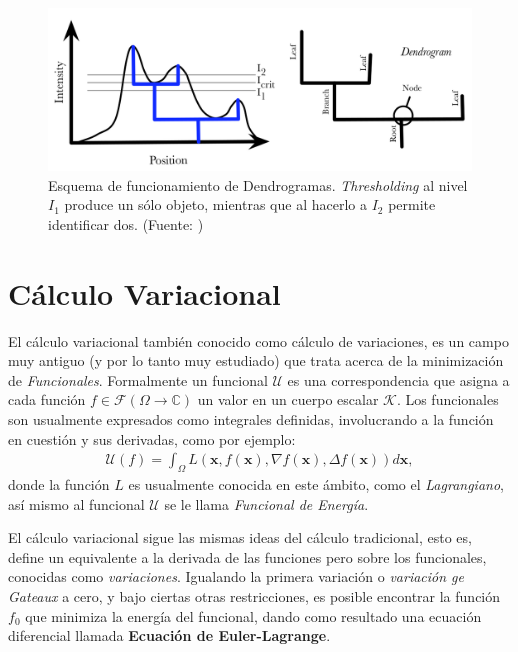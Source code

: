 \begin{figure}[htpb!]
\centering
\includegraphics[width=12cm]{dendro}
\caption{Esquema de funcionamiento de Dendrogramas. \textit{Thresholding} al nivel $I_1$ produce un sólo objeto, mientras que al hacerlo a $I_2$ permite identificar dos. (Fuente: \cite{Rosolowsky})}
\label{fig:dendro}
\end{figure}





\section{Cálculo Variacional}
El cálculo variacional también conocido como cálculo de variaciones, es un campo muy antiguo (y por lo tanto muy estudiado) que trata acerca de la minimización de \textit{Funcionales}. Formalmente un funcional $\mathcal{U}$ es una correspondencia que asigna a cada función $f \in \mathcal{F}(\Omega \rightarrow \mathbb{C})$ un valor en un cuerpo escalar $\mathcal{K}$. Los funcionales son usualmente expresados como integrales definidas, involucrando a la función en cuestión y sus derivadas, como por ejemplo:
\begin{align}
    \mathcal{U}(f) = \int_{\Omega} L\left(\mathbf{x}, f(\mathbf{x}), \nabla f(\mathbf{x}), \Delta f(\mathbf{x})\right) d \mathbf{x},
\end{align}
donde la función $L$ es usualmente conocida en este ámbito, como el \textit{Lagrangiano}, así mismo al funcional $\mathcal{U}$ se le llama \textit{Funcional de Energía}.

El cálculo variacional sigue las mismas ideas del cálculo tradicional, esto es, define un equivalente a la derivada de las funciones pero sobre los funcionales, conocidas como \textit{variaciones}. Igualando la primera variación o \textit{variación ge Gateaux} a cero, y bajo ciertas otras restricciones, es posible encontrar la función $f_0$ que minimiza la energía del funcional, dando como resultado una ecuación diferencial llamada \textbf{Ecuación de Euler-Lagrange}.

